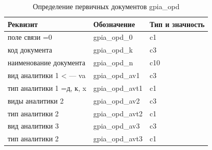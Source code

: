 \begin{table}[h!p]
    \centering
    \scriptsize
    \caption{Определение первичных документов gpia\_opd}
    \begin{tabular}{|l|l|l|} 

                                                                                   \hline
\textbf{Реквизит}           &\textbf{Обозначение}   &\textbf{Тип и значность}   \\ \hline
поле связи       =0         &gpia\_opd\_0           &c1                         \\ \hline
код документа               &gpia\_opd\_k           &c3                         \\ \hline
наименование документа      &gpia\_opd\_n           &c10                        \\ \hline
вид аналитики 1  < ---  va  &gpia\_opd\_av1         &c3                         \\ \hline
тип аналитики 1    =д, к, x &gpia\_opd\_avt1        &c1                         \\ \hline
виды аналитики 2            &gpia\_opd\_av2         &c3                         \\ \hline
тип аналитики 2             &gpia\_opd\_avt2        &c1                         \\ \hline
вид аналитики 3             &gpia\_opd\_av3         &c3                         \\ \hline
тип аналитики 2             &gpia\_opd\_avt3        &c1                         \\ \hline

    \end{tabular}
\end{table}

